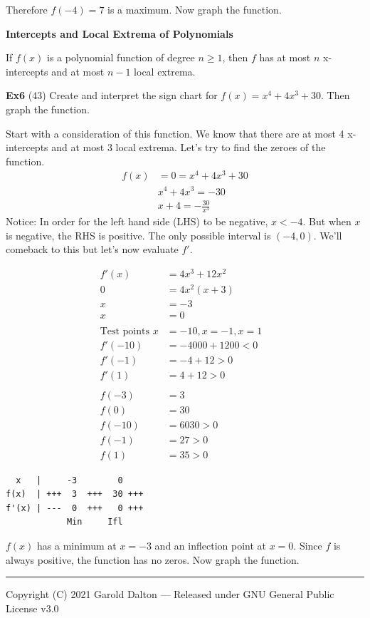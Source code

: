 \documentclass[14pt]{extarticle}
\begin{document}
Therefore $f(-4)=7$ is a maximum. Now graph the function.

\begin{tcolorbox}[enhanced jigsaw,colback=bg,boxrule=0pt,arc=0pt]
	\textbf{Intercepts and Local Extrema of Polynomials}
	
	If $f(x)$ is a polynomial function of degree $n\geq 1$, then $f$ has at most $n$ x-intercepts and at most $n-1$ local extrema.
\end{tcolorbox}

\textbf{Ex6} (43) Create and interpret the sign chart for $f(x) = x^4 +4x^3 +30$. Then graph the function.

Start with a consideration of this function. We know that there are at most 4 x-intercepts and at most 3 local extrema. Let's try to find the zeroes of the function.
\begin{align*}
	f(x) &=0 = x^4 +4x^3 +30 \\
	&x^4 +4x^3 = -30\\
	&x +4 = -\frac{30}{x^3}
\end{align*}
Notice: In order for the left hand side (LHS) to be negative, $x< -4$. But when $x$ is negative, the RHS is positive. The only possible interval is $(-4, 0) $. We'll comeback to this but let's now evaluate $f'$.

\begin{align*}
	f'(x)&=4x^3 + 12x^2  &\tag{When does f' equal 0?}\\
	0 &= 4x^2(x + 3) \\
	x &= -3 &\tag{Root} \\
	x &= 0 &\tag{Double root} \\\\
	\text{Test points } x &=-10, x=-1, x=1 \\
	f'(-10) &= -4000 + 1200 < 0 \\
	f'(-1) &= -4 + 12 > 0 \\
	f'(1) &= 4 + 12 > 0 \\\\
	f(-3) &= 3 \\
	f(0) &= 30 \\
	f(-10) &= 6030 > 0 \\
	f(-1) &= 27 > 0 \\
	f(1) &= 35 > 0
\end{align*}
\begin{verbatim}
  x   |     -3        0      
f(x)  | +++  3  +++  30 +++ 
f'(x) | ---  0  +++   0 +++  
            Min     Ifl
\end{verbatim}
$f(x)$ has a minimum at $x=-3$ and an inflection point at $x=0$. Since $f$ is always positive, the function has no zeros. Now graph the function.


\noindent\rule{\textwidth}{1pt}
{\footnotesize Copyright (C) 2021 Garold Dalton --- Released under GNU General Public License v3.0}


\cleardoublepage	
	
\end{document}
